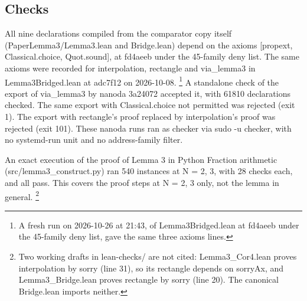 \subsection{Checks}

All nine declarations compiled from the comparator copy itself (PaperLemma3/Lemma3.lean and Bridge.lean) depend on the axioms [propext, Classical.choice, Quot.sound], at fd4aeeb under the 45-family deny list. %
The same axioms were recorded for interpolation, rectangle and via\_lemma3 in Lemma3Bridged.lean at adc7f12 on 2026-10-08. %
\footnote{A fresh run on 2026-10-26 at 21:43, of Lemma3Bridged.lean at fd4aeeb under the 45-family deny list, gave the same three axioms lines. %
}
A standalone check of the export of via\_lemma3 by nanoda 3a24072 accepted it, with 61810 declarations checked. %
The same export with Classical.choice not permitted was rejected (exit 1). %
The export with rectangle's proof replaced by interpolation's proof was rejected (exit 101). %
These nanoda runs ran as checker via sudo -u checker, with no systemd-run unit and no address-family filter. %

An exact execution of the proof of Lemma 3 in Python Fraction arithmetic (src/lemma3\_construct.py) ran 540 instances at N = 2, 3, with 28 checks each, and all pass. %
This covers the proof steps at N = 2, 3 only, not the lemma in general. %
\footnote{Two working drafts in lean-checks/ are not cited: Lemma3\_Cor4.lean proves interpolation by sorry (line 31), so its rectangle depends on sorryAx, and Lemma3\_Bridge.lean proves rectangle by sorry (line 20). %
The canonical Bridge.lean imports neither. %
}
